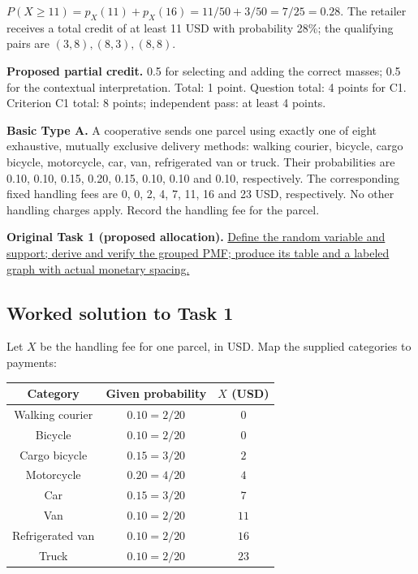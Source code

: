 $P(X\geq11)=p_X(11)+p_X(16)=11/50+3/50=7/25=0.28$. The retailer receives a total credit of at least 11 USD with probability 28\%; the qualifying pairs are $(3,8),(8,3),(8,8)$.

\textbf{Proposed partial credit.} 0.5 for selecting and adding the correct masses; 0.5 for the contextual interpretation. Total: 1 point. Question total: 4 points for C1. Criterion C1 total: 8 points; independent pass: at least 4 points.

\par\vspace{3mm}\secInicio[][sec:q2]

\clearpage
{}

\textbf{Basic Type A.} A cooperative sends one parcel using exactly one of eight exhaustive, mutually exclusive delivery methods: walking courier, bicycle, cargo bicycle, motorcycle, car, van, refrigerated van or truck. Their probabilities are 0.10, 0.10, 0.15, 0.20, 0.15, 0.10, 0.10 and 0.10, respectively. The corresponding fixed handling fees are 0, 0, 2, 4, 7, 11, 16 and 23 USD, respectively. No other handling charges apply. Record the handling fee for the parcel.

\textbf{Original Task 1 (proposed allocation).} \hyperref[sol:q3t1]{Define the random variable and support; derive and verify the grouped PMF; produce its table and a labeled graph with actual monetary spacing.} 


\subsection*{Worked solution to Task 1 }
\label{sol:q3t1}

Let $X$ be the handling fee for one parcel, in USD. Map the supplied categories to payments:

\begin{center}
\begin{tabular}{ccc}\toprule
Category & Given probability & $X$ (USD)\\\midrule
Walking courier & $0.10=2/20$ & $0$\\
Bicycle & $0.10=2/20$ & $0$\\
Cargo bicycle & $0.15=3/20$ & $2$\\
Motorcycle & $0.20=4/20$ & $4$\\
Car & $0.15=3/20$ & $7$\\
Van & $0.10=2/20$ & $11$\\
Refrigerated van & $0.10=2/20$ & $16$\\
Truck & $0.10=2/20$ & $23$\\
\bottomrule\end{tabular}
\end{center}


